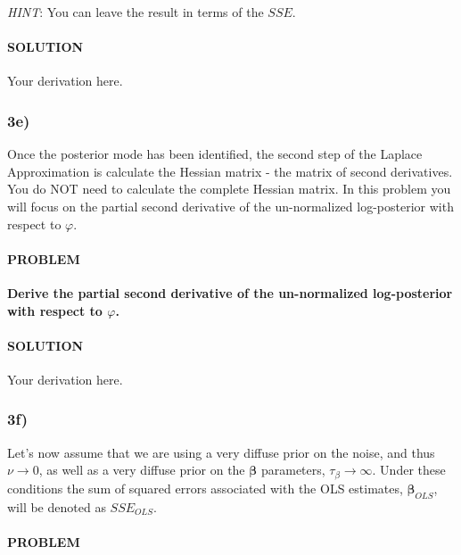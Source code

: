 \documentclass[
]{article}
\begin{document}
\emph{HINT}: You can leave the result in terms of the \(SSE\).

\hypertarget{solution-15}{%
\paragraph{SOLUTION}\label{solution-15}}

Your derivation here.

\hypertarget{e-2}{%
\subsubsection{3e)}\label{e-2}}

Once the posterior mode has been identified, the second step of the
Laplace Approximation is calculate the Hessian matrix - the matrix of
second derivatives. You do NOT need to calculate the complete Hessian
matrix. In this problem you will focus on the partial second derivative
of the un-normalized log-posterior with respect to \(\varphi\).

\hypertarget{problem-16}{%
\paragraph{PROBLEM}\label{problem-16}}

\textbf{Derive the partial second derivative of the un-normalized
log-posterior with respect to \(\varphi\).}

\hypertarget{solution-16}{%
\paragraph{SOLUTION}\label{solution-16}}

Your derivation here.

\hypertarget{f-1}{%
\subsubsection{3f)}\label{f-1}}

Let's now assume that we are using a very diffuse prior on the noise,
and thus \(\nu\rightarrow0\), as well as a very diffuse prior on the
\(\boldsymbol{\beta}\) parameters, \(\tau_{\beta} \rightarrow \infty\).
Under these conditions the sum of squared errors associated with the OLS
estimates, \(\boldsymbol{\beta}_{OLS}\), will be denoted as
\(SSE_{OLS}\).

\hypertarget{problem-17}{%
\paragraph{PROBLEM}\label{problem-17}}
\end{document}
